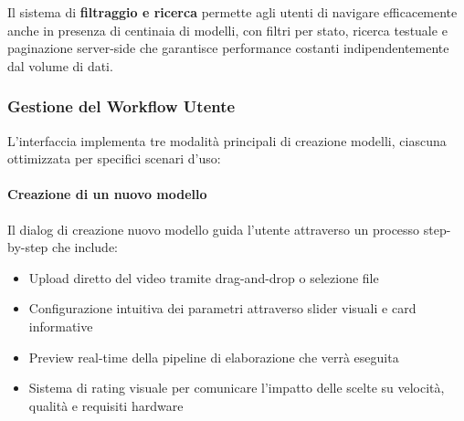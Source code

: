 Il sistema di \textbf{filtraggio e ricerca} permette agli utenti di navigare efficacemente anche in presenza di centinaia di modelli, con filtri per stato, ricerca testuale e paginazione server-side che garantisce performance costanti indipendentemente dal volume di dati.

\subsubsection{Gestione del Workflow Utente}

L'interfaccia implementa tre modalità principali di creazione modelli, ciascuna ottimizzata per specifici scenari d'uso:

\paragraph{Creazione di un nuovo modello}
Il dialog di creazione nuovo modello guida l'utente attraverso un processo step-by-step che include:
\begin{itemize}
	\item Upload diretto del video tramite drag-and-drop o selezione file
	\item Configurazione intuitiva dei parametri attraverso slider visuali e card informative
	\item Preview real-time della pipeline di elaborazione che verrà eseguita
	\item Sistema di rating visuale per comunicare l'impatto delle scelte su velocità, qualità e requisiti hardware
\end{itemize}


